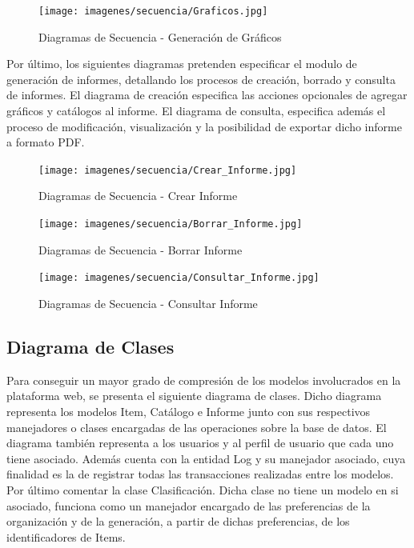 \documentclass[a4paper,11pt]{book}
\begin{document}
\begin{figure}[H] 
\centering 
\texttt{[image: imagenes/secuencia/Graficos.jpg]}
\caption{ Diagramas de Secuencia - Generación de Gráficos\cite{diagrama}  }  
\end{figure}

Por último, los siguientes diagramas pretenden especificar el modulo de generación de informes, detallando los procesos de creación, borrado y consulta de informes. El diagrama de creación especifica las acciones opcionales de agregar gráficos y catálogos al informe. El diagrama de consulta, especifica además el proceso de modificación, visualización y la posibilidad de exportar dicho informe a formato PDF. 

\begin{figure}[H] 
\centering 
\texttt{[image: imagenes/secuencia/Crear\_Informe.jpg]}
\caption{ Diagramas de Secuencia - Crear Informe\cite{diagrama}  }  
\end{figure}

\begin{figure}[H] 
\centering 
\texttt{[image: imagenes/secuencia/Borrar\_Informe.jpg]}
\caption{ Diagramas de Secuencia - Borrar Informe\cite{diagrama}  }  
\end{figure}

\begin{figure}[H] 
\centering 
\texttt{[image: imagenes/secuencia/Consultar\_Informe.jpg]}
\caption{ Diagramas de Secuencia - Consultar Informe\cite{diagrama}  }  
\end{figure}

\subsection{Diagrama de Clases}

Para conseguir un mayor grado de compresión de los modelos involucrados en la plataforma web, se presenta el siguiente diagrama de clases. Dicho diagrama representa los modelos Item, Catálogo e Informe junto con sus respectivos manejadores o clases encargadas de las operaciones sobre la base de datos. El diagrama también representa a los usuarios y al perfil de usuario que cada uno tiene asociado.  Además cuenta con la entidad Log y su manejador asociado, cuya finalidad es la de registrar todas las transacciones realizadas entre los modelos. Por último comentar la clase Clasificación. Dicha clase no tiene un modelo en si asociado, funciona como un manejador encargado de las preferencias de la organización y de la generación, a partir de dichas preferencias, de los identificadores de Items. 
\end{document}
